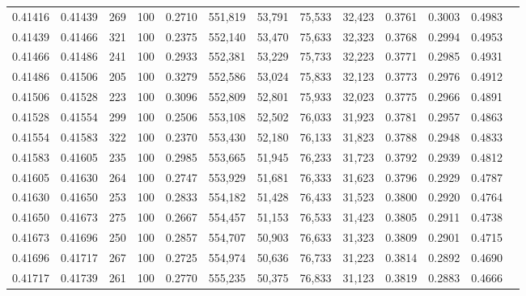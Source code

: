 \begin{tabular}{rrrrrrrrrrrrr}
0.41416 & 0.41439 &   269 & 100 &                                     0.2710 & 551,819 &  53,791 &  75,533 &  32,423 & 0.3761 & 0.3003 & 0.4983 \\
0.41439 & 0.41466 &   321 & 100 &                                     0.2375 & 552,140 &  53,470 &  75,633 &  32,323 & 0.3768 & 0.2994 & 0.4953 \\
0.41466 & 0.41486 &   241 & 100 &                                     0.2933 & 552,381 &  53,229 &  75,733 &  32,223 & 0.3771 & 0.2985 & 0.4931 \\
0.41486 & 0.41506 &   205 & 100 &                                     0.3279 & 552,586 &  53,024 &  75,833 &  32,123 & 0.3773 & 0.2976 & 0.4912 \\
0.41506 & 0.41528 &   223 & 100 &                                     0.3096 & 552,809 &  52,801 &  75,933 &  32,023 & 0.3775 & 0.2966 & 0.4891 \\
0.41528 & 0.41554 &   299 & 100 &                                     0.2506 & 553,108 &  52,502 &  76,033 &  31,923 & 0.3781 & 0.2957 & 0.4863 \\
0.41554 & 0.41583 &   322 & 100 &                                     0.2370 & 553,430 &  52,180 &  76,133 &  31,823 & 0.3788 & 0.2948 & 0.4833 \\
0.41583 & 0.41605 &   235 & 100 &                                     0.2985 & 553,665 &  51,945 &  76,233 &  31,723 & 0.3792 & 0.2939 & 0.4812 \\
0.41605 & 0.41630 &   264 & 100 &                                     0.2747 & 553,929 &  51,681 &  76,333 &  31,623 & 0.3796 & 0.2929 & 0.4787 \\
0.41630 & 0.41650 &   253 & 100 &                                     0.2833 & 554,182 &  51,428 &  76,433 &  31,523 & 0.3800 & 0.2920 & 0.4764 \\
0.41650 & 0.41673 &   275 & 100 &                                     0.2667 & 554,457 &  51,153 &  76,533 &  31,423 & 0.3805 & 0.2911 & 0.4738 \\
0.41673 & 0.41696 &   250 & 100 &                                     0.2857 & 554,707 &  50,903 &  76,633 &  31,323 & 0.3809 & 0.2901 & 0.4715 \\
0.41696 & 0.41717 &   267 & 100 &                                     0.2725 & 554,974 &  50,636 &  76,733 &  31,223 & 0.3814 & 0.2892 & 0.4690 \\
0.41717 & 0.41739 &   261 & 100 &                                     0.2770 & 555,235 &  50,375 &  76,833 &  31,123 & 0.3819 & 0.2883 & 0.4666 \\

\end{tabular}
